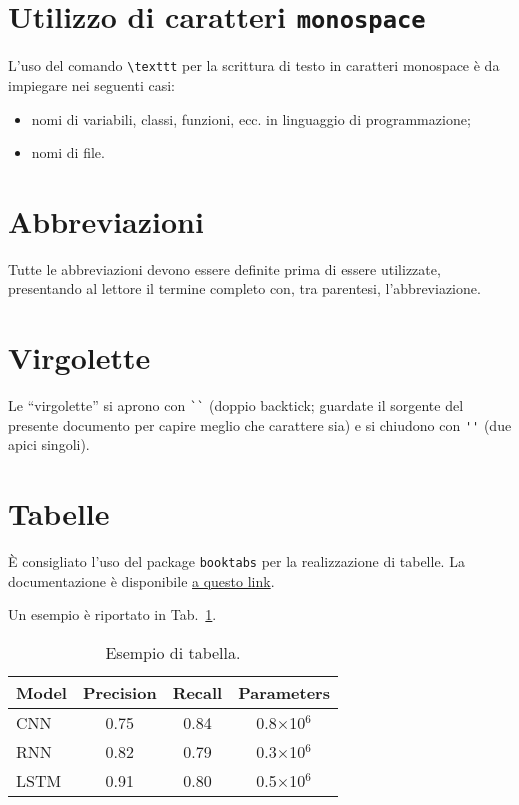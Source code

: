 \section{Utilizzo di caratteri \texttt{monospace}}

L'uso del comando \verb|\texttt| per la scrittura di testo in caratteri monospace è da impiegare nei seguenti casi:
\begin{itemize}
 \item nomi di variabili, classi, funzioni, ecc. in linguaggio di programmazione;
 \item nomi di file.
\end{itemize}

\section{Abbreviazioni}

Tutte le abbreviazioni devono essere definite prima di essere utilizzate, presentando al lettore il termine completo con, tra parentesi, l'abbreviazione.

\section{Virgolette}

Le ``virgolette'' si aprono con \verb|``| (doppio backtick; guardate il sorgente del presente documento per capire meglio che carattere sia) e si chiudono con \verb|''| (due apici singoli).

\section{Tabelle}

\`E consigliato l'uso del package \texttt{booktabs} per la realizzazione di tabelle. La documentazione è disponibile \href{https://ctan.mirror.garr.it/mirrors/ctan/macros/latex/contrib/booktabs/booktabs.pdf}{a questo link}.

Un esempio è riportato in Tab.~\ref{tab:esempio}.

\begin{table}
\centering
\begin{tabular}{lccc}
\toprule
\textbf{Model} & \textbf{Precision} & \textbf{Recall} & \textbf{Parameters} \\
\midrule
CNN & 0.75 & 0.84 & 0.8$\times$10$^6$ \\
RNN & 0.82 & 0.79 & 0.3$\times$10$^6$ \\
LSTM & 0.91 & 0.80 & 0.5$\times$10$^6$ \\
\bottomrule
\end{tabular}
\caption{Esempio di tabella.}
\label{tab:esempio}
\end{table}

